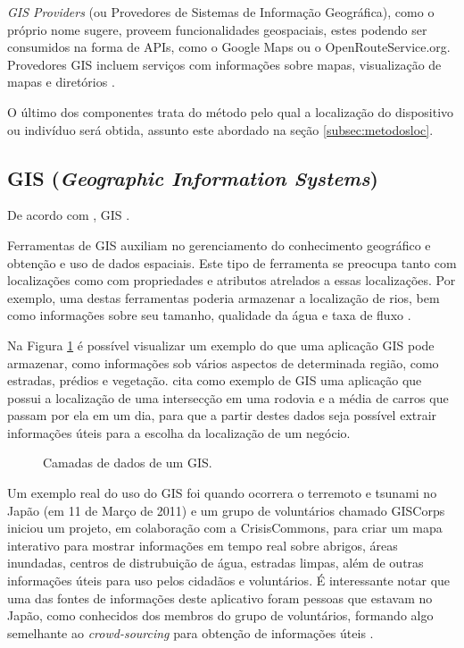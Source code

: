 \documentclass[diss]{template/setrem}
\begin{document}
\emph{GIS Providers} (ou Provedores de Sistemas de Informação Geográfica), como o próprio nome sugere, proveem funcionalidades geospaciais, estes podendo ser consumidos na forma de APIs, como o Google Maps ou o OpenRouteService.org. Provedores GIS incluem serviços com informações sobre mapas, visualização de mapas e diretórios \citep{Shek2010}.

O último dos componentes trata do método pelo qual a localização do dispositivo ou indivíduo será obtida, assunto este abordado na seção \ref{subsec:metodosloc}.

\subsection{GIS (\textit{Geographic Information Systems})}
De acordo com \citet[p. 1]{Bolstad2008}, GIS .

Ferramentas de GIS auxiliam no gerenciamento do conhecimento geográfico e obtenção e uso de dados espaciais. Este tipo de ferramenta se preocupa tanto com localizações como com propriedades e atributos atrelados a essas localizações. Por exemplo, uma destas ferramentas poderia armazenar a localização de rios, bem como informações sobre seu tamanho, qualidade da água e taxa de fluxo \citep{Bolstad2008}.

Na Figura \ref{fig:gis-layers} é possível visualizar um exemplo do que uma aplicação GIS pode armazenar, como informações sob vários aspectos de determinada região, como estradas, prédios e vegetação. \citet{Folger2011} cita como exemplo de GIS uma aplicação que possui a localização de uma intersecção em uma rodovia e a média de carros que passam por ela em um dia, para que a partir destes dados seja possível extrair informações úteis para a escolha da localização de um negócio.

\begin{figure}[!h]
    \caption{Camadas de dados de um GIS.}
    \label{fig:gis-layers}
\end{figure}

Um exemplo real do uso do GIS foi quando ocorrera o terremoto e tsunami no Japão (em 11 de Março de 2011) e um grupo de voluntários chamado GISCorps iniciou um projeto, em colaboração com a CrisisCommons, para criar um mapa interativo para mostrar informações em tempo real sobre abrigos, áreas inundadas, centros de distrubuição de água, estradas limpas, além de outras informações úteis para uso pelos cidadãos e voluntários. É interessante notar que uma das fontes de informações deste aplicativo foram pessoas que estavam no Japão, como conhecidos dos membros do grupo de voluntários, formando algo semelhante ao \emph{crowd-sourcing} para obtenção de informações úteis \citep{Folger2011}.
\end{document}
